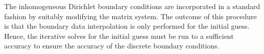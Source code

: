 

The inhomogeneous Dirichlet boundary conditions are incorporated in a standard fashion by suitably modifying the matrix system. The outcome of this procedure is that the boundary data interpolation is only performed for the initial guess. Hence, the iterative solves for the initial guess must be run to a sufficient accuracy to ensure the accuracy of the discrete boundary conditions.




